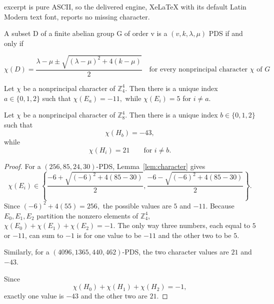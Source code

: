 \documentclass[10pt,a4paper]{amsart}
\newcommand{\Z}{\mathbb{Z}}
\begin{document}
excerpt is pure ASCII, so the delivered engine, XeLaTeX with its default Latin Modern text font, reports no missing character.
\begin{lemma}\label{lem:character} A subset D of a finite abelian group G of order v is a $(v, k, \lambda, \mu)$ PDS if and only if
    
\[
\chi(D) = \frac{\lambda - \mu \pm \sqrt{(\lambda - \mu)^2 + 4(k-\mu)}}{2} \quad \text{for every nonprincipal character } \chi \text{ of } G
\]
\end{lemma}

\begin{lemma}
\label{lem:partition-character-patterns}
Let \(\chi\) be a nonprincipal character of \(\Z_4^4\). Then there
is a unique index \(a\in\{0,1,2\}\) such that $\chi(E_a)=-11,$ while $\chi(E_i)=5$ for $i\neq a$.

Let \(\chi\) be a nonprincipal character of \(\Z_8^4\). Then there
is a unique index \(b\in\{0,1,2\}\) such that
\[
\chi(H_b)=-43,
\]
while
\[
\chi(H_i)=21
\qquad
\text{for }i\neq b.
\]
\end{lemma}

\begin{proof}
For a \((256,85,24,30)\)-PDS, Lemma~\ref{lem:character}
gives
\[
\chi(E_i)\in
\left\{
\frac{-6+\sqrt{(-6)^2+4(85-30)}}{2},
\frac{-6-\sqrt{(-6)^2+4(85-30)}}{2}
\right\}.
\]
Since $(-6)^2+4(55)=256,$ the possible values are $5$ and $-11$. Because \(E_0,E_1,E_2\) partition the nonzero elements of \(\Z_4^4\), $\chi(E_0)+\chi(E_1)+\chi(E_2)=-1.$
The only way three numbers, each equal to \(5\) or \(-11\), can sum to \(-1\) is for one value to be \(-11\) and the other two to be
\(5\).

Similarly, for a \((4096,1365,440,462)\)-PDS, the two character values are $21$ and $-43$.

Since
\[
\chi(H_0)+\chi(H_1)+\chi(H_2)=-1,
\]
exactly one value is \(-43\) and the other two are \(21\).
\end{proof}
\end{document}
